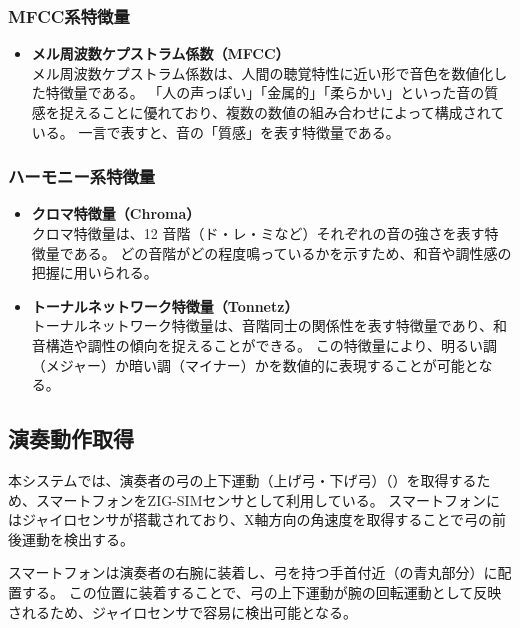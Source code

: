 \subsubsection{MFCC系特徴量}

\begin{itemize}
	\item \textbf{メル周波数ケプストラム係数（MFCC）}　\\
	    メル周波数ケプストラム係数は、人間の聴覚特性に近い形で音色を数値化した特徴量である。
       「人の声っぽい」「金属的」「柔らかい」といった音の質感を捉えることに優れており、複数の数値の組み合わせによって構成されている。
        一言で表すと、音の「質感」を表す特徴量である。
\end{itemize}

\subsubsection{ハーモニー系特徴量}

\begin{itemize}
	\item \textbf{クロマ特徴量（Chroma）}　\\
        クロマ特徴量は、12 音階（ド・レ・ミなど）それぞれの音の強さを表す特徴量である。
        どの音階がどの程度鳴っているかを示すため、和音や調性感の把握に用いられる。
    \item \textbf{トーナルネットワーク特徴量（Tonnetz）}　\\
        トーナルネットワーク特徴量は、音階同士の関係性を表す特徴量であり、和音構造や調性の傾向を捉えることができる。
        この特徴量により、明るい調（メジャー）か暗い調（マイナー）かを数値的に表現することが可能となる。
\end{itemize}

\subsection{演奏動作取得}

本システムでは、演奏者の弓の上下運動（上げ弓・下げ弓）（）を取得するため、スマートフォンをZIG-SIMセンサとして利用している。
スマートフォンにはジャイロセンサが搭載されており、X軸方向の角速度を取得することで弓の前後運動を検出する。

スマートフォンは演奏者の右腕に装着し、弓を持つ手首付近（の青丸部分）に配置する。
この位置に装着することで、弓の上下運動が腕の回転運動として反映されるため、ジャイロセンサで容易に検出可能となる。

